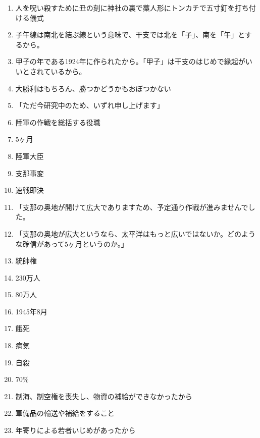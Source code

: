 \documentclass[]{jsarticle}
\begin{document}
\begin{enumerate}
	\item 人を呪い殺すために丑の刻に神社の裏で藁人形にトンカチで五寸釘を打ち付ける儀式
	\item 子午線は南北を結ぶ線という意味で、干支では北を「子」、南を「午」とするから。
	\item 甲子の年である1924年に作られたから。「甲子」は干支のはじめで縁起がいいとされているから。
		\\
	\item 大勝利はもちろん、勝つかどうかもおぼつかない
	\item 「ただ今研究中のため、いずれ申し上げます」
	\item 陸軍の作戦を総括する役職
	\item 5ヶ月
	\item 陸軍大臣
	\item 支那事変
	\item 速戦即決
	\item 「支那の奥地が開けて広大でありますため、予定通り作戦が進みませんでした。
	\item 「支那の奥地が広大というなら、太平洋はもっと広いではないか。どのような確信があって5ヶ月というのか。」
	\item 統帥権
	\item 230万人
	\item 80万人
	\item 1945年8月
	\item 餓死
	\item 病気
	\item 自殺
	\item 70\%
	\item 制海、制空権を喪失し、物資の補給ができなかったから
	\item 軍備品の輸送や補給をすること
	\item 年寄りによる若者いじめがあったから
\end{enumerate}
\end{document}
